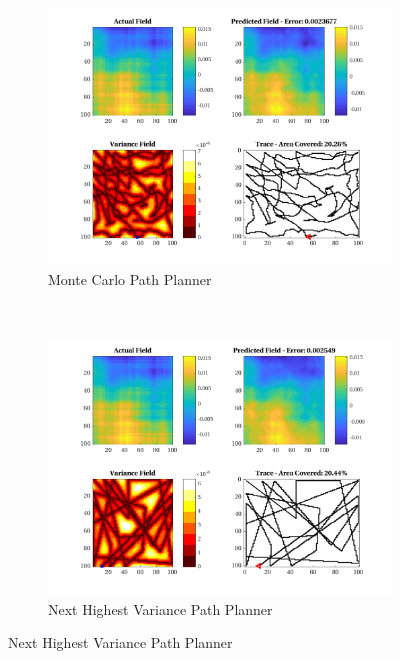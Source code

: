 \begin{figure}[htb!]
    \centering
    \begin{subfigure}[t]{0.5\textwidth}
        \centering
        \includegraphics[width=\linewidth]{figures/hbresults/mc_20p_100x100_sf_50_seed_2.png}
        \captionsetup{skip=0.10\baselineskip,size=footnotesize}
        \caption{Monte Carlo Path Planner}
    \end{subfigure}%
    ~ 
    \begin{subfigure}[t]{0.5\textwidth}
        \centering
        \includegraphics[width=\linewidth]{figures/hbresults/nhv_20p_100x100_sf_50_seed_2.png}
        \captionsetup{skip=0.10\baselineskip,size=footnotesize}
        \caption{Next Highest Variance Path Planner}

\end{subfigure}
\end{figure}

